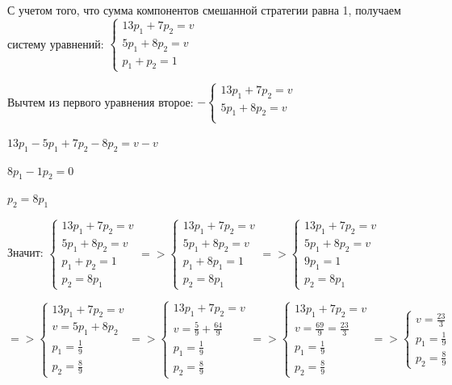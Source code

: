 С учетом того, что сумма компонентов смешанной стратегии равна 1, получаем систему уравнений: $
\begin{cases}
  13 p_1 + 7 p_2 = v \\
  5 p_1 + 8 p_2 = v \\
  p_1 + p_2 = 1
\end{cases}
$

Вычтем из первого уравнения второе: $-
\begin{cases}
  13 p_1 + 7 p_2 = v \\
  5 p_1 + 8 p_2 = v \\
\end{cases}
$

$13 p_1 - 5 p_1 + 7 p_2 - 8 p_2 = v - v$

$8 p_1 - 1 p_2 = 0$

$p_2 = 8 p_1$

Значит: $
\begin{cases}
  13 p_1 + 7 p_2 = v \\
  5 p_1 + 8 p_2 = v \\
  p_1 + p_2 = 1 \\
  p_2 = 8 p_1
\end{cases} =>
\begin{cases}
  13 p_1 + 7 p_2 = v \\
  5 p_1 + 8 p_2 = v \\
  p_1 + 8 p_1 = 1 \\
  p_2 = 8 p_1
\end{cases} =>
\begin{cases}
  13 p_1 + 7 p_2 = v \\
  5 p_1 + 8 p_2 = v \\
  9 p_1 = 1 \\
  p_2 = 8 p_1
\end{cases}
$

$ =>
\begin{cases}
  13 p_1 + 7 p_2 = v \\
  v = 5 p_1 + 8 p_2 \\
  p_1 = \frac{1}{9} \\
  p_2 = \frac{8}{9}
\end{cases} =>
\begin{cases}
  13 p_1 + 7 p_2 = v \\
  v = \frac{5}{9} + \frac{64}{9} \\
  p_1 = \frac{1}{9} \\
  p_2 = \frac{8}{9}
\end{cases} =>
\begin{cases}
  13 p_1 + 7 p_2 = v \\
  v = \frac{69}{9} = \frac{23}{3} \\
  p_1 = \frac{1}{9} \\
  p_2 = \frac{8}{9}
\end{cases} =>
\begin{cases}
  v = \frac{23}{3} \\
  p_1 = \frac{1}{9} \\
  p_2 = \frac{8}{9}
\end{cases}
$

